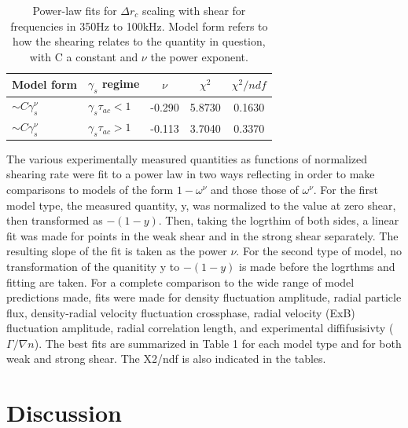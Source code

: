 \documentclass[aip,pop,amsmath,amssymb,reprint,superscriptaddress]{revtex4-1} %
\begin{document}
\begin{table}
\caption{\label{tab:table6}Power-law fits for $\Delta r_{c}$ scaling with shear for frequencies in 350Hz to 100kHz. Model form refers to how the shearing relates to the quantity in question, with C a constant and $\nu$ the power exponent.}
\begin{ruledtabular}
\begin{tabular}{llccc}
Model form&$\gamma_{s}$ regime&$\nu$&$\chi^2$&$\chi^2/ndf$\\
\hline
$\sim C\gamma_{s}^\nu$&$\gamma_{s}\tau_{ac}<1$ &-0.290 &5.8730 &0.1630\\
$\sim C\gamma_{s}^\nu$&$\gamma_{s}\tau_{ac}>1$ &-0.113 &3.7040 &0.3370\\
\end{tabular}
\end{ruledtabular}
\end{table}

The various experimentally measured quantities as functions of normalized shearing rate were fit to a power law in two ways reflecting in order to make comparisons to models of the form $1-\omega^{\nu}$ and those those of $\omega^{\nu}$. For the first model type, the measured quantity, y, was normalized to the value at zero shear, then transformed as $-(1-y)$. Then, taking the logrthim of both sides, a linear fit was made for points in the weak shear and in the strong shear separately. The resulting slope of the fit is taken as the power $\nu$. For the second type of model, no transformation of the quanitity y to $-(1-y)$ is made before the logrthms and fitting are taken. For a complete comparison to the wide range of model predictions made, fits were made for density fluctuation amplitude, radial particle flux, density-radial velocity fluctuation crossphase, radial velocity (ExB) fluctuation amplitude, radial correlation length, and experimental diffifusisivty ($\Gamma/\nabla n$). The best fits are summarized in Table 1 for each model type and for both weak and strong shear. The X2/ndf is also indicated in the tables.

\section{Discussion}
\end{document}
